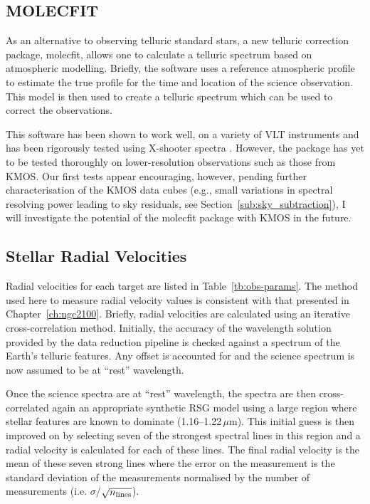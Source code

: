 
\subsection{MOLECFIT} %
\label{sub:molecfit}

As an alternative to observing telluric standard stars, a new telluric correction package, {\sc molecfit}, allows one to calculate a telluric spectrum based on atmospheric modelling.
Briefly, the software uses a reference atmospheric profile to estimate the true profile for the time and location of the science observation.
This model is then used to create a telluric spectrum which can be used to correct the observations.

This software has been shown to work well, on a variety of VLT instruments
\citep{2015A&A...576A..77S} and has been rigorously tested using X-shooter spectra
\citep{2015A&A...576A..78K}.
However, the package has yet to be tested thoroughly on lower-resolution observations such as those from KMOS.
Our first tests appear encouraging, however, pending further characterisation of the KMOS data cubes
(e.g., small variations in spectral resolving power leading to sky residuals,
see Section~\ref{sub:sky_subtraction}),
I will investigate the potential of the {\sc molecfit} package with KMOS in the future.


\subsection{Stellar Radial Velocities} %
\label{sub:RVs}


Radial velocities for each target are listed in Table~\ref{tb:obs-params}.
The method used here to measure radial velocity values is consistent with that presented in Chapter~\ref{ch:ngc2100}.
Briefly, radial velocities are calculated using an iterative cross-correlation method.
Initially, the accuracy of the wavelength solution provided by the data reduction pipeline is checked against a spectrum of the Earth's telluric features.
Any offset is accounted for and the science spectrum is now assumed to be at ``rest'' wavelength.

Once the science spectra are at ``rest'' wavelength, the spectra are then cross-correlated again an appropriate synthetic RSG model using a large region where stellar features are known to dominate (1.16--1.22\,$\mu$m).
This initial guess is then improved on by selecting seven of the strongest spectral lines in this region and a radial velocity is calculated for each of these lines.
The final radial velocity is the mean of these seven strong lines where the error on the measurement is the standard deviation of the measurements normalised by the number of measurements
(i.e. $\sigma$/$\sqrt{n_{\rm lines}}$).


